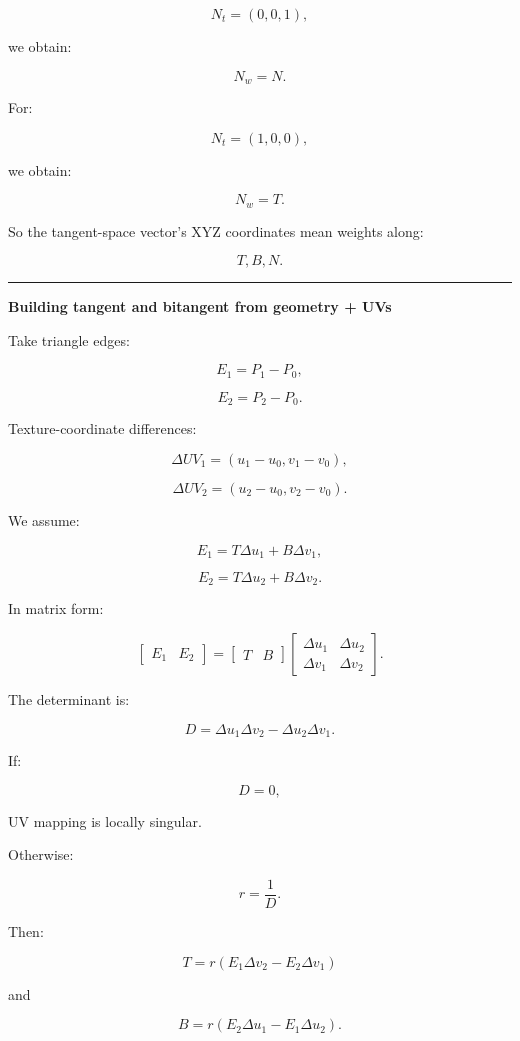 \[
N_t=(0,0,1),
\]

we obtain:

\[
N_w=N.
\]

For:

\[
N_t=(1,0,0),
\]

we obtain:

\[
N_w=T.
\]

So the tangent-space vector's XYZ coordinates mean weights along:

\[
T,B,N.
\]

\begin{center}\rule{0.5\linewidth}{0.5pt}\end{center}

\textbf{Building tangent and bitangent from geometry + UVs}

Take triangle edges:

\[
E_1=P_1-P_0,
\]

\[
E_2=P_2-P_0.
\]

Texture-coordinate differences:

\[
\Delta UV_1=
(u_1-u_0,v_1-v_0),
\]

\[
\Delta UV_2=
(u_2-u_0,v_2-v_0).
\]

We assume:

\[
E_1=
T\Delta u_1+
B\Delta v_1,
\]

\[
E_2=
T\Delta u_2+
B\Delta v_2.
\]

In matrix form:

\[
\begin{bmatrix}
E_1&E_2
\end{bmatrix}
=
\begin{bmatrix}
T&B
\end{bmatrix}
\begin{bmatrix}
\Delta u_1&\Delta u_2\\
\Delta v_1&\Delta v_2
\end{bmatrix}.
\]

The determinant is:

\[
D=
\Delta u_1\Delta v_2
-
\Delta u_2\Delta v_1.
\]

If:

\[
D=0,
\]

UV mapping is locally singular.

Otherwise:

\[
r=\frac1D.
\]

Then:

\[
\boxed{
T=
r(
E_1\Delta v_2
-
E_2\Delta v_1
)
}
\]

and

\[
\boxed{
B=
r(
E_2\Delta u_1
-
E_1\Delta u_2
).
}
\]

